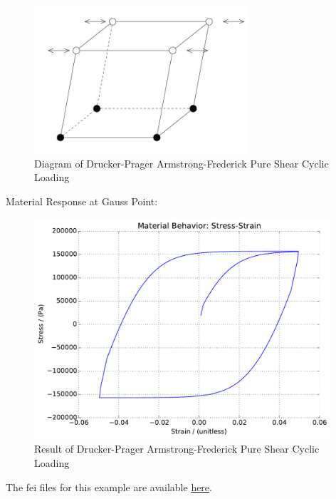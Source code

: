 \documentclass[fleqn,11pt]{article}
\begin{document}
\begin{figure}[H]
\begin{center}
\includegraphics[width=8cm]{../Figure-files/shear_cyclic_brick.JPG}
\caption{
\label{Diagram Drucker-Prager Armstrong-Frederick Pure Shear Cyclic Loadin}
Diagram of Drucker-Prager Armstrong-Frederick Pure Shear Cyclic Loading}
\end{center}
\end{figure}

Material Response at Gauss Point:

\begin{figure}[H]
\begin{center}
\includegraphics[width=11cm]{../fei_examples/Drucker_Prager_Armstrong_Frederick/2pure_shear_cyclic_loading/result.pdf}
\caption{
\label{Result of Drucker-Prager Armstrong-Frederick Pure Shear Cyclic Loadin}
Result of Drucker-Prager Armstrong-Frederick Pure Shear Cyclic Loading}
\end{center}
\end{figure}

The fei files for this example are available \href{https://github.com/yuan-energy/education_examples/tree/master/fei_examples/Drucker_Prager_Armstrong_Frederick/2pure_shear_cyclic_loading}{here}.
\end{document}
